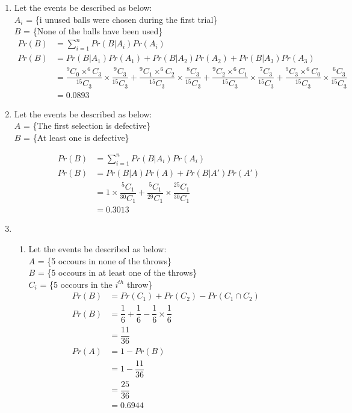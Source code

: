\documentclass{article}
\begin{document}
\begin{enumerate}
		\item \large
		Let the events be described as below:\\
		
		$A_{i}$ = \{i unused balls were chosen during the first trial\}\\
		$B$ = \{None of the balls have been used\}\\
		
		\begin{align*}
		Pr(B) &= \sum\limits_{i = 1}^{n} Pr(B | A_{i}) Pr(A_{i})\\
		Pr(B) &= Pr(B | A_{1}) Pr(A_{1}) + Pr(B | A_{2}) Pr(A_{2}) + Pr(B | A_{3}) Pr(A_{3})\\
		&= \dfrac{^{9}C_{0} \times ^{6}C_{3}}{^{15}C_{3}} \times \dfrac{^{9}C_{3}}{^{15}C_{3}} + \dfrac{^{9}C_{1} \times ^{6}C_{2}}{^{15}C_{3}} \times \dfrac{^{8}C_{3}}{^{15}C_{3}} +  \dfrac{^{9}C_{2} \times ^{6}C_{1}}{^{15}C_{3}} \times \dfrac{^{7}C_{3}}{^{15}C_{3}} + \dfrac{^{9}C_{3} \times ^{6}C_{0}}{^{15}C_{3}} \times \dfrac{^{6}C_{3}}{^{15}C_{3}}\\
		&= \mathbf{0.0893}
		\end{align*}
		
		\newpage
		
		\item \large Let the events be described as below:\\
		$A$ = \{The first selection is defective\}\\
		$B$ = \{At least one is defective\}
		
		\begin{align*}
			Pr(B) &= \sum\limits_{i = 1}^{n} Pr(B | A_{i}) Pr(A_{i})\\
			Pr(B) &= Pr(B | A) Pr(A) + Pr(B | A') Pr(A')\\
				  &= 1 \times \dfrac{^{5}C_{1}}{^{30}C_{1}} + \dfrac{^{5}C_{1}}{^{29}C_{1}} \times \dfrac{^{25}C_{1}}{^{30}C_{1}}\\
				  &= \mathbf{0.3013}
		\end{align*}
		
		\newpage
		
		\item \large 
		
		\begin{enumerate}
			\item 
			Let the events be described as below:\\
			$A$ = \{5 occours in none of the throws\}\\
			$B$ = \{5 occours in at least one of the throws\}\\
			$C_{i}$ = \{5 occours in the $i^{th}$ throw\}
			\begin{align*}
				Pr(B) &= Pr(C_{1}) + Pr(C_{2}) - Pr(C_{1} \cap C_{2})\\
				Pr(B) &= \dfrac{1}{6} + \dfrac{1}{6} - \dfrac{1}{6} \times \dfrac{1}{6}\\
				&= \dfrac{11}{36}\\
				Pr(A) &= 1 - Pr(B)\\
				&= 1 - \dfrac{11}{36}\\
				&= \dfrac{25}{36}\\
				&= \mathbf{0.6944}
			\end{align*}
			

\end{enumerate}
\end{enumerate}
\end{document}

